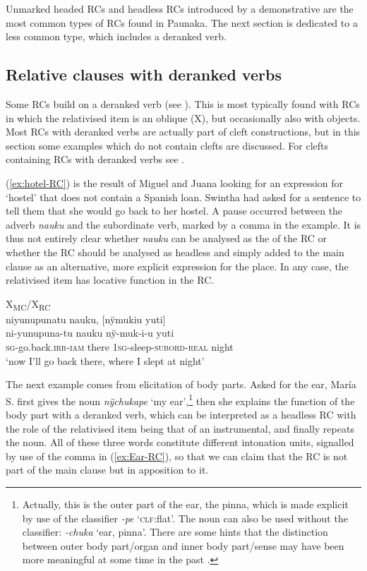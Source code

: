 Unmarked headed RCs and headless RCs introduced by a demonstrative are the most common types of RCs found in Paunaka. The next section is dedicated to a less common type, which includes a deranked verb.

\subsection{Relative clauses with deranked verbs}\label{sec:RC-Subord}

Some RCs build on a deranked verb (see ). This is most typically found with RCs in which the relativised item is an oblique (X), but occasionally also with objects. Most RCs with deranked verbs are actually part of cleft constructions, but in this section some examples which do not contain clefts are discussed. For clefts containing RCs with deranked verbs see .

(\ref{ex:hotel-RC}) is the result of Miguel and Juana looking for an expression for ‘hostel’ that does not contain a Spanish loan. Swintha had asked for a sentence to tell them that she would go back to her hostel. A pause occurred between the adverb \textit{nauku} and the subordinate verb, marked by a comma in the example. It is thus not entirely clear whether \textit{nauku} can be analysed as the  of the RC or whether the RC should be analysed as headless and simply added to the main clause as an alternative, more explicit expression for the place. In any case, the relativised item has locative function in the RC.

\ea\label{ex:hotel-RC}
\begingl
\glpreamble  \textup{X\textsubscript{MC}/X\textsubscript{RC}}\\niyunupunatu nauku, \textup{[}nÿmukiu yuti\textup{]}\\
\gla ni-yunupuna-tu nauku nÿ-muk-i-u yuti\\
\textsc{sg}-go.back.\textsc{irr}-\textsc{iam} there 1\textsc{sg}-sleep-\textsc{subord}-\textsc{real} night\\
\glft ‘now I’ll go back there, where I slept at night’
\endgl
\trailingcitation{[jmx-e090727s.381s]}
\xe

The next example comes from elicitation of body parts. Asked for the ear, María S. first gives the noun \textit{nÿchukape} ‘my ear’,\footnote{Actually, this is the outer part of the ear, the pinna, which is made explicit by use of the classifier \textit{-pe} ‘\textsc{clf:}flat’. The noun can also be used without the classifier: \textit{-chuka} ‘ear, pinna’. There are some hints that the distinction between outer body part/organ and inner body part/sense may have been more meaningful at some time in the past \citep[cf.][]{TerhartDanielsenBODY}.} then she explains the function of the body part with a deranked verb, which can be interpreted as a headless RC with the role of the relativised item being that of an instrumental, and finally repeats the noun. All of these three words constitute different intonation units, signalled by use of the comma in (\ref{ex:Ear-RC}), so that we can claim that the RC is not part of the main clause but in apposition to it.

